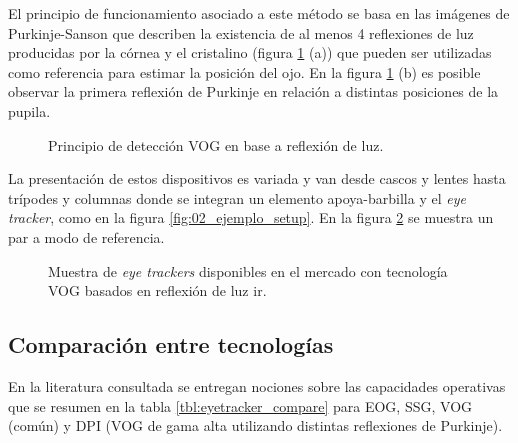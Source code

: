 \documentclass[../main.tex]{subfiles}
\begin{document}
\begin{enumerate}
				El principio de funcionamiento asociado a este método se basa en las imágenes de Purkinje-Sanson que describen la existencia de al menos 4 reflexiones de luz producidas por la córnea y el cristalino (figura \ref{fig:02_et_vog1} (a)) que pueden ser utilizadas como referencia para estimar la posición del ojo. En la figura \ref{fig:02_et_vog1} (b) es posible observar la primera reflexión de Purkinje en relación a distintas posiciones de la pupila.
				\begin{figure}[H]
					\centering
					\hspace{5mm}
					\caption[Principio de detección VOG en base a reflexión de luz]{Principio de detección VOG en base a reflexión de luz\cite{dissertation:eyetrackers}.}
					\label{fig:02_et_vog1}
				\end{figure}

				La presentación de estos dispositivos es variada y van desde cascos y lentes hasta trípodes y columnas donde se integran un elemento apoya-barbilla y el \textit{eye tracker}, como en la figura \ref{fig:02_ejemplo_setup}. En la figura \ref{fig:02_et_vog2} se muestra un par a modo de referencia. 
				\begin{figure}[H]
					\centering
					\hspace{5mm}
					\caption[Muestra de \textit{eye trackers} disponibles en el mercado con tecnología VOG basados en reflexión de luz \acrshort{ir}]{Muestra de \textit{eye trackers} disponibles en el mercado con tecnología VOG basados en reflexión de luz \acrshort{ir}\footnotemark.}
					\label{fig:02_et_vog2}
				\end{figure}

			\end{enumerate}

		\subsection{Comparación entre tecnologías}
		\label{sub:02_comparativa_eyetracker}
			En la literatura consultada \cite{dissertation:eyetrackers, article:eyetracker_eggert, article:eyetracker_richardson} se entregan nociones sobre las capacidades operativas que se resumen en la tabla \ref{tbl:eyetracker_compare} para EOG, SSG, VOG (común) y DPI (VOG de gama alta utilizando distintas reflexiones de Purkinje). 
\end{document}
